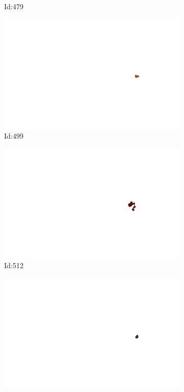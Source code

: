\documentclass[12pt,twoside]{report}
\begin{document}
\begin{figure}
\begin{subfigure}[b]{0.20\textwidth}
\caption{Id:479}
\end{subfigure}
\begin{subfigure}[b]{0.20\textwidth}
\centering
\includegraphics[width=\textwidth]{../../trajectories/499.png}
\caption{Id:499}
\end{subfigure}
\begin{subfigure}[b]{0.20\textwidth}
\centering
\includegraphics[width=\textwidth]{../../trajectories/512.png}
\caption{Id:512}
\end{subfigure}
\begin{subfigure}[b]{0.20\textwidth}
\centering
\includegraphics[width=\textwidth]{../../trajectories/557.png}

\end{subfigure}
\end{figure}
\end{document}
